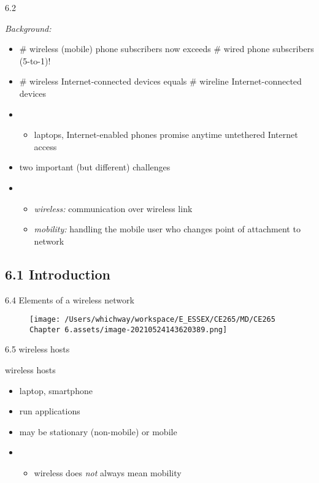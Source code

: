 \documentclass[
]{article}
\begin{document}
6.2

\emph{Background:}

\begin{itemize}
\item
  \# wireless (mobile) phone subscribers now exceeds \# wired phone
  subscribers (5-to-1)!
\item
  \# wireless Internet-connected devices equals \# wireline
  Internet-connected devices
\item
  \begin{itemize}
  \item
    laptops, Internet-enabled phones promise anytime untethered Internet
    access
  \end{itemize}
\item
  two important (but different) challenges
\item
  \begin{itemize}
  \item
    \emph{wireless:} communication over wireless link
  \item
    \emph{mobility:} handling the mobile user who changes point of
    attachment to network
  \end{itemize}
\end{itemize}

\hypertarget{61-introduction}{%
\subsection{\texorpdfstring{6.1 Introduction
}{6.1 Introduction }}\label{61-introduction}}

6.4 Elements of a wireless network

\begin{figure}
\centering
\texttt{[image: /Users/whichway/workspace/E\_ESSEX/CE265/MD/CE265 Chapter 6.assets/image-20210524143620389.png]}
\caption{}
\end{figure}

6.5 wireless hosts

wireless hosts

\begin{itemize}
\item
  laptop, smartphone
\item
  run applications
\item
  may be stationary (non-mobile) or mobile
\item
  \begin{itemize}
  \item
    wireless does \emph{not} always mean mobility
  \end{itemize}
\end{itemize}
\end{document}
